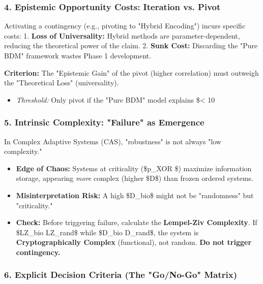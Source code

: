 \documentclass{article}
\begin{document}
\subsubsection{4. Epistemic Opportunity Costs: Iteration vs. Pivot}

Activating a contingency (e.g., pivoting to "Hybrid Encoding") incurs specific costs:
1.  \textbf{Loss of Universality:} Hybrid methods are parameter-dependent, reducing the theoretical power of the claim.
2.  \textbf{Sunk Cost:} Discarding the "Pure BDM" framework wastes Phase 1 development.

\textbf{Criterion:} The "Epistemic Gain" of the pivot (higher correlation) must outweigh the "Theoretical Loss" (universality).
\begin{itemize}
\item   \textit{Threshold:} Only pivot if the "Pure BDM" model explains \$< 10\\%
\end{itemize}

\subsubsection{5. Intrinsic Complexity: "Failure" as Emergence}

In Complex Adaptive Systems (CAS), "robustness" is not always "low complexity."
\begin{itemize}
\item   \textbf{Edge of Chaos:} Systems at criticality (\$p\_{XOR} \$) maximize information storage, appearing \textit{more} complex (higher \$D\$) than frozen ordered systems.
\item   \textbf{Misinterpretation Risk:} A high \$D\_{bio}\$ might not be "randomness" but "criticality."
\item   \textbf{Check:} Before triggering failure, calculate the \textbf{Lempel-Ziv Complexity}. If \$LZ\_{bio} \gg LZ\_{rand}\$ while \$D\_{bio} \approx D\_{rand}\$, the system is \textbf{Cryptographically Complex} (functional), not random. \textbf{Do not trigger contingency.}
\end{itemize}

\subsubsection{6. Explicit Decision Criteria (The "Go/No-Go" Matrix)}
\end{document}
